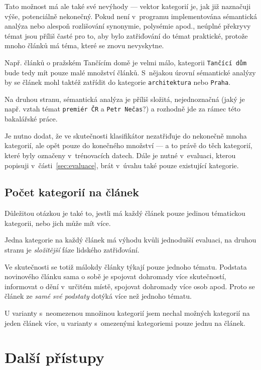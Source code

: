 \documentclass[12pt,a4paper]{report}
\begin{document}
Tato možnost má ale také své nevýhody --- vektor kategorií je, jak již naznačuji výše, potenciálně nekonečný. Pokud není v~programu implementována sémantická analýza nebo alespoň rozlišování synonymie, polysémie apod., neúplné překryvy témat jsou příliš časté pro to, aby bylo zatřiďování do témat praktické, protože mnoho článků má téma, které se znovu nevyskytne.

Např. článků o pražském Tančícím domě je velmi málo, kategorii \texttt{Tančící dům} bude tedy mít pouze malé množství článků. S~nějakou úrovní sémantické analýzy by se článek mohl taktéž  zatřídit do kategorie \texttt{architektura} nebo \texttt{Praha}. 

Na druhou stranu, sémantická analýza je příliš složitá, nejednoznačná (jaký je např. vztah témat \texttt{premiér ČR} a \texttt{Petr Nečas}?) a rozhodně jde za rámec této bakalářské práce.

Je nutno dodat, že ve skutečnosti klasifikátor nezatřiďuje do nekonečně mnoha kategorií, ale opět pouze do konečného množství --- a to právě do těch kategorií, které byly označeny v~trénovacích datech. Dále je nutné v~evaluaci, kterou popisuji v~části~\ref{sec:evaluace}, brát v~úvahu také pouze existující kategorie.

\subsection{Počet kategorií na článek} 
Důležitou otázkou je také to, jestli má každý článek pouze jedinou tématickou kategorii, nebo jich může mít více.

Jedna kategorie na každý článek má výhodu kvůli jednodušší evaluaci, na druhou stranu je \emph{složitější} fáze lidského zatřiďování.

Ve skutečnosti se totiž málokdy články týkají pouze jednoho tématu. Podstata novinového článku sama o sobě je spojovat dohromady více skutečností, informovat o dění v~určitém místě, spojovat dohromady více osob apod. Proto se článek ze \emph{samé své podstaty} dotýká více než jednoho tématu. 

U varianty s~neomezenou množinou kategorií jsem nechal možných kategorií na jeden článek více, u varianty s~omezenými kategoriemi pouze jednu na článek.

\section{Další přístupy}
\label{sec:dalsipristupy}
\end{document}
